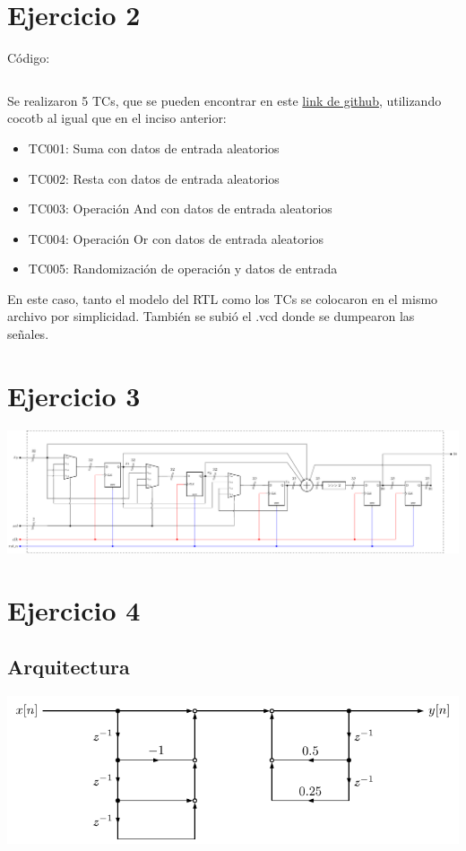 \documentclass{article}
\begin{document}
    \newpage
    \section{Ejercicio 2}
    Código:
    \inputminted[fontsize=\scriptsize]{systemverilog}{../arith_operator/rtl/arith_operator.sv}

    Se realizaron 5 TCs, que se pueden encontrar en este \href{https://github.com/msebgarcia/DDA2024/blob/main/GP01/arith_operator/tb/test_module.py}{link de github}, utilizando cocotb al igual que en el inciso anterior:
    \begin{itemize}
        \item TC001: Suma con datos de entrada aleatorios
        \item TC002: Resta con datos de entrada aleatorios
        \item TC003: Operación And  con datos de entrada aleatorios
        \item TC004: Operación Or con datos de entrada aleatorios
        \item TC005: Randomización de operación y datos de entrada
    \end{itemize}
    En este caso, tanto el modelo del RTL como los TCs se colocaron en el mismo archivo por simplicidad. También se subió el .vcd donde se dumpearon las señales.
    
    \newpage
    \section{Ejercicio 3}
    \begin{center}
        \includegraphics[angle=90, scale=.65]{../test_module/architecture.pdf}
    \end{center}
     
    \newpage
    \section{Ejercicio 4}
    \subsection{Arquitectura}
    \begin{center}
        \includegraphics[width=\linewidth]{../iir_filter/draw/draw.pdf}
    \end{center}
\end{document}
